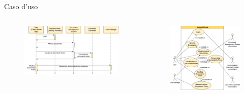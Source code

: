     \begin{frame}{Caso d'uso}
        \begin{columns}[onlytextwidth]
            \begin{column}{0.6\textwidth}
                \begin{figure}[H]
                \centering
                \includegraphics[width=1\textwidth]{img/tesi-2-Use-case2.drawio.png}
                \end{figure}
            \end{column}
            \begin{column}{0.4\textwidth}
                \begin{figure}[H]
                \centering
                \includegraphics[width=1\textwidth]{img/tesi-1-Use-case.drawio.png}
                \end{figure}
            \end{column}
        \end{columns}
    \end{frame}

